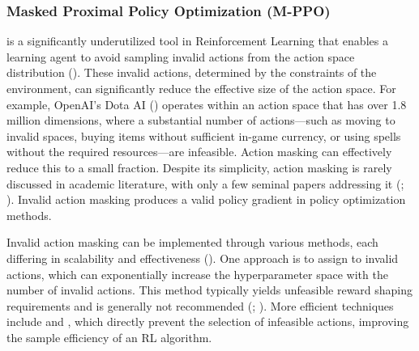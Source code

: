         \subsubsection{Masked Proximal Policy Optimization (M-PPO)}
        \label{subsec:M-PPO}

            \noindent{} is a significantly underutilized tool in Reinforcement Learning that enables a learning agent to avoid sampling invalid actions from the action space distribution (\textcolor{deepblue}{\cite{Huang_2022}}). These invalid actions, determined by the constraints of the environment, can significantly reduce the effective size of the action space. For example, OpenAI's Dota AI (\textcolor{deepblue}{\cite{openai2019dota}}) operates within an action space that has over 1.8 million dimensions, where a substantial number of actions—such as moving to invalid spaces, buying items without sufficient in-game currency, or using spells without the required resources—are infeasible. Action masking can effectively reduce this to a small fraction. Despite its simplicity, action masking is rarely discussed in academic literature, with only a few seminal papers addressing it (\textcolor{deepblue}{\cite{vinyals2017starcraft}; \cite{malmo}}). Invalid action masking produces a valid policy gradient in policy optimization methods.
            
            \bigskip
            
            \noindent Invalid action masking can be implemented through various methods, each differing in scalability and effectiveness (\textcolor{deepblue}{\cite{SpinningUp2018}}). One approach is to assign  to invalid actions, which can exponentially increase the hyperparameter space with the number of invalid actions. This method typically yields unfeasible reward shaping requirements and is generally not recommended (\textcolor{deepblue}{\cite{app13148283}; \cite{dietterich1999hierarchical}}). More efficient techniques include  and , which directly prevent the selection of infeasible actions, improving the sample efficiency of an RL algorithm. 
            
            \bigskip
            
